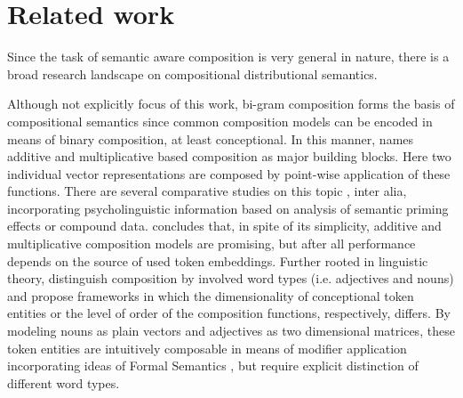 \section{Related work}
Since the task of semantic aware composition is very general in nature, there is a broad research landscape on compositional distributional semantics. 

Although not explicitly focus of this work, bi-gram composition forms the basis of compositional semantics since common composition models can be encoded in means of binary composition, at least conceptional. In this manner, \textcite{zanzotto_estimating_2010} names additive and multiplicative based composition as major building blocks. Here two individual vector representations are composed by point-wise application of these functions. There are several comparative studies on this topic \autocite{mitchell_composition_2010, dima_reverse-engineering_2015}, inter alia, incorporating psycholinguistic information based on analysis of semantic priming effects or compound data. \textcite{mitchell_composition_2010} concludes that, in spite of its simplicity, additive and multiplicative composition models are promising, but after all performance depends on the source of used token embeddings. %
Further rooted in linguistic theory, \textcite{baroni_nouns_2010, baroni_frege_2014} distinguish composition by involved word types (i.e. adjectives and nouns) and propose frameworks in which the dimensionality of conceptional token entities or the level of order of the composition functions, respectively, differs. By modeling nouns as plain vectors and adjectives as two dimensional matrices, these token entities are intuitively composable in means of modifier application incorporating ideas of Formal Semantics \autocite{montague_proper_1973}, but require explicit distinction of different word types.

